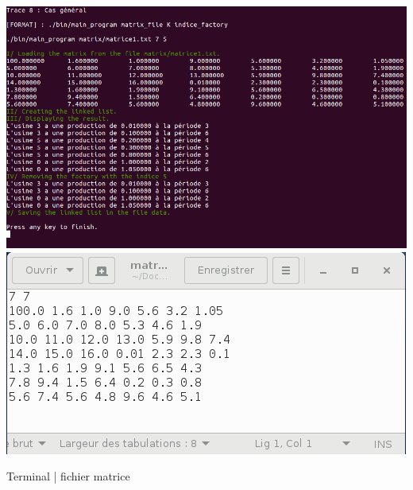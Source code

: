 \documentclass[a4paper]{article}
\begin{document}
\begin{center}
\includegraphics[scale=0.3]{trace_9.png}
\includegraphics[scale=0.3]{matrice_general.png}

Terminal | fichier matrice
\end{center}
\end{document}
